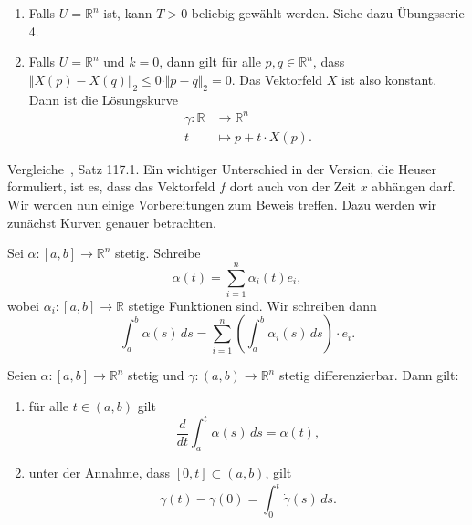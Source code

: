 \documentclass[../main.tex]{subfiles}
\begin{document}
\begin{remark}
  \leavevmode
  \begin{enumerate}[\normalfont1.]
    \item Falls $U = \mathbb{R}^n$ ist, kann $T > 0$ 
      beliebig gewählt werden.
      Siehe dazu Übungsserie 4.
    \item Falls $U = \mathbb{R}^n$ und $k = 0$, 
      dann gilt für alle $p,q \in \mathbb{R}^n$,
      dass 
      $\Vert X(p)  - X(q) \Vert_2 
      \leq 0 \cdot \Vert p - q \Vert_2 = 0$.
      Das Vektorfeld $X$ ist also konstant.
      Dann ist die Lösungskurve
      \begin{align*}
        \gamma \colon \mathbb{R} & \to \mathbb{R}^n \\
        t & \mapsto p + t \cdot X(p).
      \end{align*}
  \end{enumerate}
\end{remark}


Vergleiche~\cite{heuser}, Satz 117.1.
Ein wichtiger Unterschied in der Version,
die Heuser formuliert, ist es,
dass das Vektorfeld $f$ dort auch von der Zeit $x$
abhängen darf.
Wir werden nun einige Vorbereitungen zum Beweis
treffen.
Dazu werden wir zunächst Kurven genauer betrachten.

\begin{definition}
  Sei $\alpha \colon [a, b] \to \mathbb{R}^n$ stetig.
  Schreibe 
  \[\alpha(t) = \sum_{i=1}^{n} \alpha_i(t) e_i,
  \]
  wobei $\alpha_i \colon [a, b] \to \mathbb{R}$ stetige Funktionen sind.
  Wir schreiben dann
  \[
    \int_{a}^{b} \alpha(s) \, ds
    = \sum_{i=1}^{n} \left( 
      \int_a^b
      \alpha_i(s) \, ds
    \right) \cdot e_i.
  \]
\end{definition}

\begin{proposition}
  Seien $\alpha \colon [a, b] \to \mathbb{R}^n$ stetig
  und $\gamma \colon (a, b) \to \mathbb{R}^n$ 
  stetig differenzierbar.
  Dann gilt:
  \begin{enumerate}[\normalfont(i)]
    \item für alle $t \in (a, b)$ gilt
      \[
        \frac{d}{dt} \int_{a}^{t} \alpha(s) \, ds = \alpha(t),
      \]
    \item unter der Annahme, dass $[0, t] \subset (a, b)$, gilt
      \[
        \gamma(t) - \gamma(0) = \int_{0}^{t} \dot \gamma(s) \, ds.
      \]
  \end{enumerate}
\end{proposition}
\end{document}

